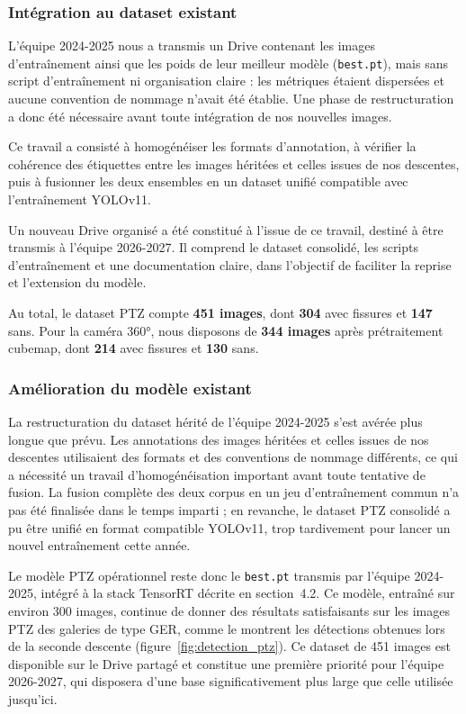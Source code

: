 \documentclass[12pt,a4paper]{article}
\begin{document}
\subsubsection{Intégration au dataset existant}

L'équipe 2024-2025 nous a transmis un Drive contenant les images d'entraînement ainsi que les poids de leur meilleur modèle (\texttt{best.pt}), mais sans script d'entraînement ni organisation claire : les métriques étaient dispersées et aucune convention de nommage n'avait été établie. Une phase de restructuration a donc été nécessaire avant toute intégration de nos nouvelles images.

Ce travail a consisté à homogénéiser les formats d'annotation, à vérifier la cohérence des étiquettes entre les images héritées et celles issues de nos descentes, puis à fusionner les deux ensembles en un dataset unifié compatible avec l'entraînement YOLOv11.

Un nouveau Drive organisé a été constitué à l'issue de ce travail, destiné à être transmis à l'équipe 2026-2027. Il comprend le dataset consolidé, les scripts d'entraînement et une documentation claire, dans l'objectif de faciliter la reprise et l'extension du modèle.

Au total, le dataset PTZ compte \textbf{451 images}, dont \textbf{304} avec fissures et \textbf{147} sans. Pour la caméra 360°, nous disposons de \textbf{344 images} après prétraitement cubemap, dont \textbf{214} avec fissures et \textbf{130} sans.

\subsubsection{Amélioration du modèle existant}

La restructuration du dataset hérité de l'équipe 2024-2025 s'est avérée plus longue que prévu. Les annotations des images héritées et celles issues de nos descentes utilisaient des formats et des conventions de nommage différents, ce qui a nécessité un travail d'homogénéisation important avant toute tentative de fusion. La fusion complète des deux corpus en un jeu d'entraînement commun n'a pas été finalisée dans le temps imparti ; en revanche, le dataset PTZ consolidé a pu être unifié en format compatible YOLOv11, trop tardivement pour lancer un nouvel entraînement cette année.

Le modèle PTZ opérationnel reste donc le \texttt{best.pt} transmis par l'équipe 2024-2025, intégré à la stack TensorRT décrite en section~4.2. Ce modèle, entraîné sur environ 300 images, continue de donner des résultats satisfaisants sur les images PTZ des galeries de type GER, comme le montrent les détections obtenues lors de la seconde descente (figure~\ref{fig:detection_ptz}). Ce dataset de 451 images est disponible sur le Drive partagé et constitue une première priorité pour l'équipe 2026-2027, qui disposera d'une base significativement plus large que celle utilisée jusqu'ici.
\end{document}
